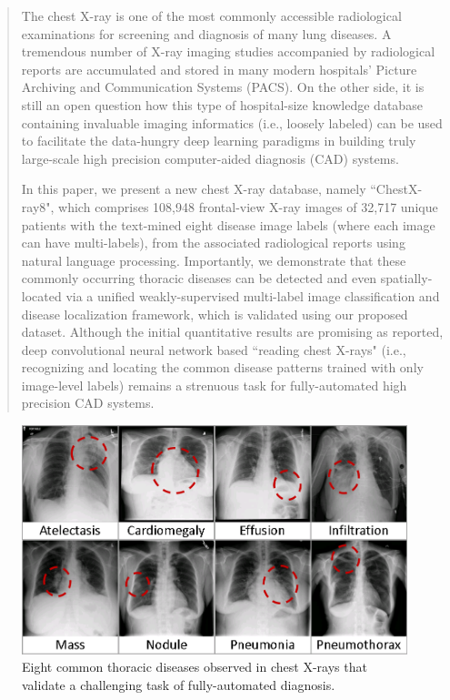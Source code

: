\documentclass[10pt,twocolumn,letterpaper]{article}
\begin{document}
\begin{abstract}
The chest X-ray is one of the most commonly accessible radiological examinations for screening and diagnosis of many lung diseases. A tremendous number of X-ray imaging studies accompanied by radiological reports are accumulated and stored in many modern hospitals' Picture Archiving and Communication Systems (PACS). On the other side, it is still an open question how this type of hospital-size knowledge database containing invaluable imaging informatics (i.e., loosely labeled) can be used to facilitate the data-hungry deep learning paradigms in building truly large-scale high precision computer-aided diagnosis (CAD) systems. 

In this paper, we present a new chest X-ray database, namely ``ChestX-ray8", which comprises 108,948 frontal-view X-ray images of 32,717 unique patients with the text-mined eight disease image labels (where each image can have multi-labels), from the associated radiological reports using natural language processing. Importantly, we demonstrate that these commonly occurring thoracic diseases can be detected and even spatially-located via a unified weakly-supervised multi-label image classification and disease localization framework, which is validated using our proposed dataset. %
Although the initial quantitative results are promising as reported, deep convolutional neural network based ``reading chest X-rays" (i.e., recognizing and locating the common disease patterns trained with only image-level labels) remains a strenuous task for fully-automated high precision CAD systems. %
\end{abstract} %

\begin{figure}[]
	\includegraphics[width=1\columnwidth]{8_diseases_2.png}
	\caption{Eight common thoracic diseases observed in chest X-rays that validate a challenging task of fully-automated diagnosis.}
	\label{fig:8_diseases}
\end{figure}
\end{document}
